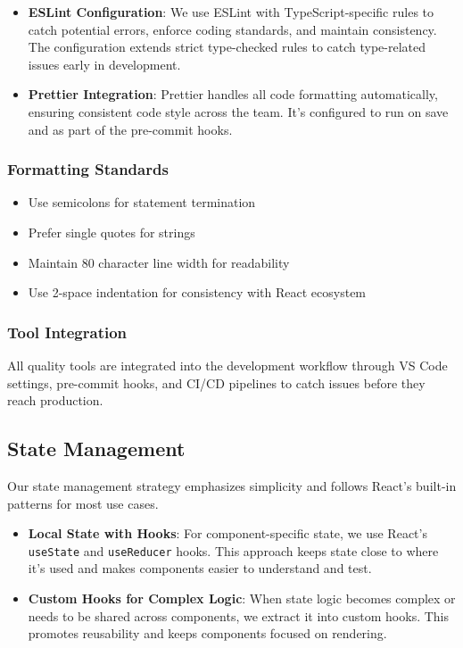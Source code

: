 \documentclass[12pt]{article}
\begin{document}
\begin{itemize}
    \item \textbf{ESLint Configuration}: We use ESLint with TypeScript-specific rules to catch potential errors, enforce coding standards, and maintain consistency. The configuration extends strict type-checked rules to catch type-related issues early in development.
    
    \item \textbf{Prettier Integration}: Prettier handles all code formatting automatically, ensuring consistent code style across the team. It's configured to run on save and as part of the pre-commit hooks.
\end{itemize}

\subsubsection{Formatting Standards}
\begin{itemize}
    \item Use semicolons for statement termination
    \item Prefer single quotes for strings
    \item Maintain 80 character line width for readability
    \item Use 2-space indentation for consistency with React ecosystem
\end{itemize}

\subsubsection{Tool Integration}
All quality tools are integrated into the development workflow through VS Code settings, pre-commit hooks, and CI/CD pipelines to catch issues before they reach production.

\subsection{State Management}
Our state management strategy emphasizes simplicity and follows React's built-in patterns for most use cases.

\begin{itemize}
    \item \textbf{Local State with Hooks}: For component-specific state, we use React's \texttt{useState} and \texttt{useReducer} hooks. This approach keeps state close to where it's used and makes components easier to understand and test.
    
    \item \textbf{Custom Hooks for Complex Logic}: When state logic becomes complex or needs to be shared across components, we extract it into custom hooks. This promotes reusability and keeps components focused on rendering.
\end{itemize}
\end{document}
